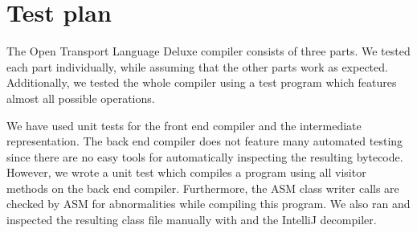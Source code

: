 \chapter{Test plan}

The Open Transport Language Deluxe compiler consists of three parts.
We tested each part individually, while assuming that the other parts work as expected.
Additionally, we tested the whole compiler using a test program which features almost all possible operations.

We have used unit tests for the front end compiler and the intermediate representation.
The back end compiler does not feature many automated testing since there are no easy tools for automatically inspecting the resulting bytecode.
However, we wrote a unit test which compiles a program using all visitor methods on the back end compiler.
Furthermore, the ASM class writer calls are checked by ASM for abnormalities while compiling this program.
We also ran and inspected the resulting class file manually with  and the IntelliJ decompiler.
